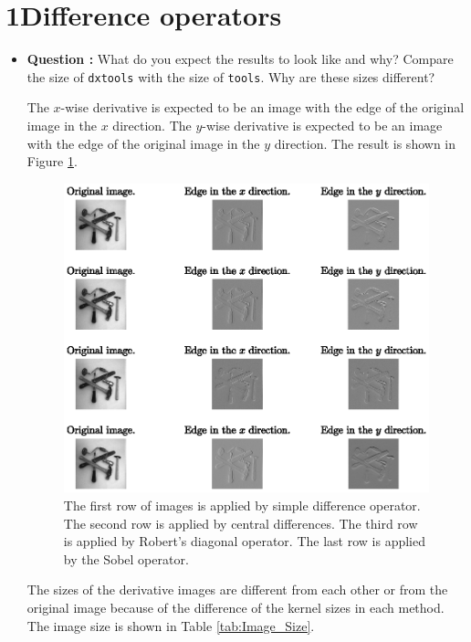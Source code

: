 \documentclass[11pt,a4paper]{article}
\begin{document}
\section*{1\hspace{0.5cm}Difference operators}
	\begin{itemize}
		\item\addtocounter{Counter}{1}\textbf{Question :} What do you expect the results to look like and why? Compare the size of \texttt{dxtools} with the size of \texttt{tools}. Why are these sizes different?
			\par The $x$-wise derivative is expected to be an image with the edge of the original image in the $x$ direction. The $y$-wise derivative is expected to be an image with the edge of the original image in the $y$ direction. The result is shown in Figure \ref{fig:Question_1}.
			\begin{figure}[!ht]
				\centering
				\includegraphics[width=\columnwidth]{Question_1.eps}
				\caption{The first row of images is applied by simple difference operator. The second row is applied by central differences. The third row is applied by Robert's diagonal operator. The last row is applied by the Sobel operator.}
				\label{fig:Question_1}
			\end{figure}
			\par The sizes of the derivative images are different from each other or from the original image because of the difference of the kernel sizes in each method. The image size is shown in Table \ref{tab:Image_Size}. 

\end{itemize}
\end{document}
